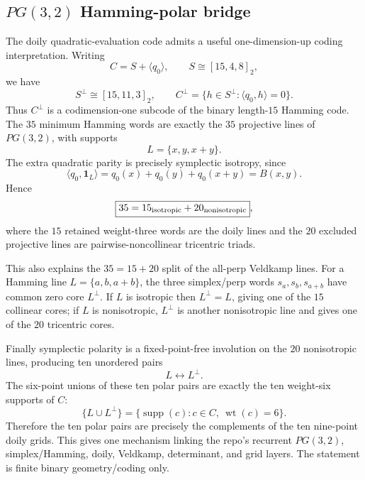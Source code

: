 \subsection{$PG(3,2)$ Hamming-polar bridge}
\label{sec:pg32-hamming-polar-bridge}

The doily quadratic-evaluation code admits a useful one-dimension-up coding
interpretation. Writing
\[
C=S+\langle q_0\rangle,
\qquad S\cong[15,4,8]_2,
\]
we have
\[
S^\perp\cong[15,11,3]_2,
\qquad
C^\perp=\{h\in S^\perp:\langle q_0,h\rangle=0\}.
\]
Thus $C^\perp$ is a codimension-one subcode of the binary length-$15$ Hamming
code. The $35$ minimum Hamming words are exactly the $35$ projective lines of
$PG(3,2)$, with supports
\[
L=\{x,y,x+y\}.
\]
The extra quadratic parity is precisely symplectic isotropy, since
\[
\boxed{
\langle q_0,\mathbf1_L\rangle
=q_0(x)+q_0(y)+q_0(x+y)
=B(x,y).
}
\]
Hence
\[
\boxed{35=15_{\rm isotropic}+20_{\rm nonisotropic}},
\]
where the $15$ retained weight-three words are the doily lines and the $20$
excluded projective lines are pairwise-noncollinear tricentric triads.

This also explains the $35=15+20$ split of the all-perp Veldkamp lines. For a
Hamming line $L=\{a,b,a+b\}$, the three simplex/perp words
$s_a,s_b,s_{a+b}$ have common zero core $L^\perp$. If $L$ is isotropic then
$L^\perp=L$, giving one of the $15$ collinear cores; if $L$ is nonisotropic,
$L^\perp$ is another nonisotropic line and gives one of the $20$ tricentric
cores.

Finally symplectic polarity is a fixed-point-free involution on the $20$
nonisotropic lines, producing ten unordered pairs
\[
L\longleftrightarrow L^\perp.
\]
The six-point unions of these ten polar pairs are exactly the ten weight-six
supports of $C$:
\[
\boxed{
\{L\cup L^\perp\}
=
\{\operatorname{supp}(c):c\in C,\ \operatorname{wt}(c)=6\}.
}
\]
Therefore the ten polar pairs are precisely the complements of the ten
nine-point doily grids. This gives one mechanism linking the repo's recurrent
$PG(3,2)$, simplex/Hamming, doily, Veldkamp, determinant, and grid layers.
The statement is finite binary geometry/coding only.
